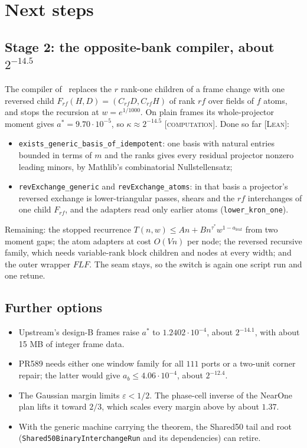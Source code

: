 \documentclass[11pt]{amsart}
\theoremstyle{remark}
\newcommand{\lean}[1]{\texttt{#1}}
\newcommand{\tagL}{\textsc{[Lean]}}
\newcommand{\tagC}{\textsc{[computation]}}
\begin{document}
\section{Next steps}\label{sec:next}

\subsection{Stage 2: the opposite-bank compiler, about $2^{-14.5}$}
The compiler of~\cite{ICE} replaces the $r$ rank-one children of a frame change with one
reversed child $F_{rf}(H, D) = (C_{rf} D, C_{rf} H)$ of rank $r f$ over fields of $f$ atoms, and
stops the recursion at $w = e^{1/1000}$. On plain frames its whole-projector moment gives $a^* =
9.70 \cdot 10^{-5}$, so $\kappa \approx 2^{-14.5}$ \tagC. Done so far \tagL:
\begin{itemize}
\item \lean{exists\_generic\_basis\_of\_idempotent}: one basis with natural entries bounded in
  terms of $m$ and the ranks gives every residual projector nonzero leading minors, by Mathlib's
  combinatorial Nullstellensatz;
\item \lean{revExchange\_generic} and \lean{revExchange\_atoms}: in that basis a projector's
  reversed exchange is lower-triangular passes, shears and the $rf$ interchanges of one child
  $F_{rf}$, and the adapters read only earlier atoms (\lean{lower\_kron\_one}).
\end{itemize}
Remaining: the stopped recurrence $T(n, w) \le A n + B n^{\tau^*} w^{1 - a_{\mathrm{leaf}}}$ from
two moment gaps; the atom adapters at cost $O(Vn)$ per node; the reversed recursive family, which
needs variable-rank block children and nodes at every width; and the outer wrapper $F L F$. The
seam stays, so the switch is again one script run and one retune.

\subsection{Further options}
\begin{itemize}
\item Upstream's design-B frames raise $a^*$ to $1.2402 \cdot 10^{-4}$, about $2^{-14.1}$, with
  about 15 MB of integer frame data.
\item PR589 needs either one window family for all $111$ ports or a two-unit corner repair; the
  latter would give $a_b \le 4.06 \cdot 10^{-4}$, about $2^{-12.4}$.
\item The Gaussian margin limits $\varepsilon < 1/2$. The phase-cell inverse of the NearOne
  plan lifts it toward $2/3$, which scales every margin above by about $1.37$.
\item With the generic machine carrying the theorem, the Shared50 tail and root
  (\lean{Shared50BinaryInterchangeRun} and its dependencies) can retire.
\end{itemize}
\end{document}
